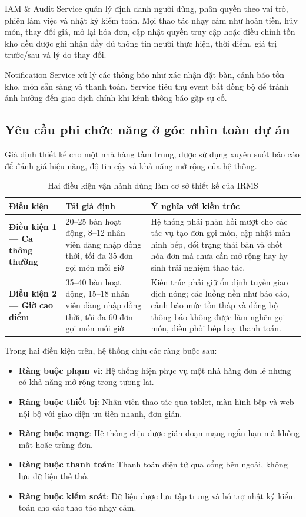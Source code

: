 \textsf{IAM \& Audit Service} quản lý định danh người dùng, phân quyền theo vai trò, phiên làm việc và nhật ký kiểm toán. Mọi thao tác nhạy cảm như hoàn tiền, hủy món, thay đổi giá, mở lại hóa đơn, cập nhật quyền truy cập hoặc điều chỉnh tồn kho đều được ghi nhận đầy đủ thông tin người thực hiện, thời điểm, giá trị trước/sau và lý do thay đổi.

\textsf{Notification Service} xử lý các thông báo như xác nhận đặt bàn, cảnh báo tồn kho, món sẵn sàng và thanh toán. Service tiêu thụ event bất đồng bộ để tránh ảnh hưởng đến giao dịch chính khi kênh thông báo gặp sự cố.

\subsection{Yêu cầu phi chức năng ở góc nhìn toàn dự án}\label{sec:nfr}
Giả định thiết kế cho một nhà hàng tầm trung, được sử dụng xuyên suốt báo cáo để đánh giá hiệu năng, độ tin cậy và khả năng mở rộng của hệ thống.

\begin{table}[H]
\centering
\caption{Hai điều kiện vận hành dùng làm cơ sở thiết kế của IRMS}
\small
\begin{tabularx}{\textwidth}{>{\bfseries}p{3.2cm} p{4.4cm} X}
\toprule
Điều kiện & Tải giả định & Ý nghĩa với kiến trúc \\
\midrule
Điều kiện 1 --- Ca thông thường & 20--25 bàn hoạt động, 8--12 nhân viên đăng nhập đồng thời, tối đa 35 đơn gọi món mỗi giờ & Hệ thống phải phản hồi mượt cho các tác vụ tạo đơn gọi món, cập nhật màn hình bếp, đổi trạng thái bàn và chốt hóa đơn mà chưa cần mở rộng hay hy sinh trải nghiệm thao tác. \\
Điều kiện 2 --- Giờ cao điểm & 35--40 bàn hoạt động, 15--18 nhân viên đăng nhập đồng thời, tối đa 60 đơn gọi món mỗi giờ & Kiến trúc phải giữ ổn định tuyến giao dịch nóng; các luồng nền như báo cáo, cảnh báo mức tồn thấp và đồng bộ thông báo không được làm nghẽn gọi món, điều phối bếp hay thanh toán. \\
\bottomrule
\end{tabularx}
\end{table}

Trong hai điều kiện trên, hệ thống chịu các ràng buộc sau:
\begin{itemize}
    \item \textbf{Ràng buộc phạm vi}: Hệ thống hiện phục vụ một nhà hàng đơn lẻ nhưng có khả năng mở rộng trong tương lai.
    \item \textbf{Ràng buộc thiết bị}: Nhân viên thao tác qua tablet, màn hình bếp và web nội bộ với giao diện ưu tiên nhanh, đơn giản.
    \item \textbf{Ràng buộc mạng}: Hệ thống chịu được gián đoạn mạng ngắn hạn mà không mất hoặc trùng đơn.
    \item \textbf{Ràng buộc thanh toán}: Thanh toán điện tử qua cổng bên ngoài, không lưu dữ liệu thẻ thô.
    \item \textbf{Ràng buộc kiểm soát}: Dữ liệu được lưu tập trung và hỗ trợ nhật ký kiểm toán cho các thao tác nhạy cảm.
\end{itemize}

